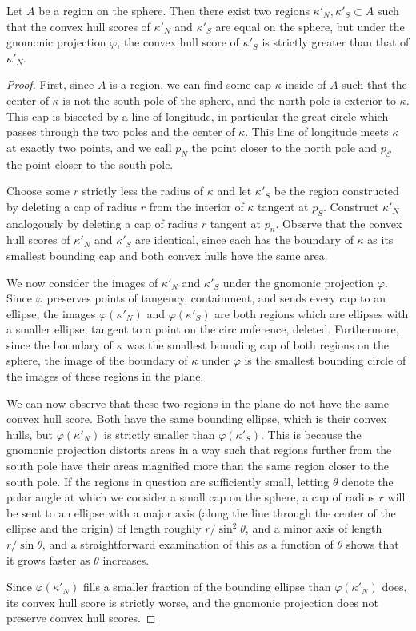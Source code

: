 \begin{theorem}
	\label{thm:convhull}
	Let $A$ be a region on the sphere.  Then there exist two regions $\kappa'_N,\kappa'_S\subset A$ such that the convex hull scores of $\kappa'_N$ and $\kappa'_S$ are equal on the sphere, but under the gnomonic projection $\varphi$, the convex hull score of $\kappa'_S$ is strictly greater than that of $\kappa'_N$. 
\end{theorem}

\begin{proof}
	First, since $A$ is a region, we can find some cap $\kappa$ inside of $A$ such that the center of $\kappa$ is not the south pole of the sphere, and the north pole is exterior to $\kappa$.  This cap is bisected by a line of longitude, in particular the great circle which passes through the two poles and the center of $\kappa$.  This line of longitude meets $\kappa$ at exactly two points, and we call $p_N$ the point closer to the north pole and $p_S$ the point closer to the south pole.
	
	Choose some $r$ strictly less the radius of $\kappa$ and let $\kappa'_S$ be the region constructed by deleting a cap of radius $r$ from the interior of $\kappa$ tangent at $p_S$.  Construct $\kappa'_N$ analogously by deleting a cap of radius $r$ tangent at $p_n$. Observe that the convex hull scores of $\kappa'_N$ and $\kappa'_S$ are identical, since each has the boundary of $\kappa$ as its smallest bounding cap and both convex hulls have the same area.
	
	We now consider the images of $\kappa'_N$ and $\kappa'_S$ under the gnomonic projection $\varphi$.  Since $\varphi$ preserves points of tangency, containment, and sends every cap to an ellipse, the images $\varphi(\kappa'_N)$ and $\varphi(\kappa'_S)$ are both regions which are ellipses with a smaller ellipse, tangent to a point on the circumference, deleted.  Furthermore, since the boundary of $\kappa$ was the smallest bounding cap of both regions on the sphere, the image of the boundary of $\kappa$ under $\varphi$ is the smallest bounding circle of the images of these regions in the plane.
	
	We can now observe that these two regions in the plane do not have the same convex hull score.  Both have the same bounding ellipse, which is their convex hulls, but $\varphi(\kappa'_N)$ is strictly smaller than $\varphi(\kappa'_S)$.  This is because the gnomonic projection distorts areas in a way such that regions further from the south pole have their areas magnified more than the same region closer to the south pole.  If the regions in question are sufficiently small, letting $\theta$ denote the polar angle at which we consider a small cap on the sphere, a cap of radius $r$ will be sent to an ellipse with a major axis (along the line through the center of the ellipse and the origin) of length roughly $r/\sin^2{\theta}$, and a minor axis of length $r/\sin{\theta}$, and a straightforward examination of this as a function of $\theta$ shows that it grows faster as $\theta$ increases.
	
	Since $\varphi(\kappa'_N)$ fills a smaller fraction of the bounding ellipse than $\varphi(\kappa'_N)$ does, its convex hull score is strictly worse, and the gnomonic projection does not preserve convex hull scores.
\end{proof}